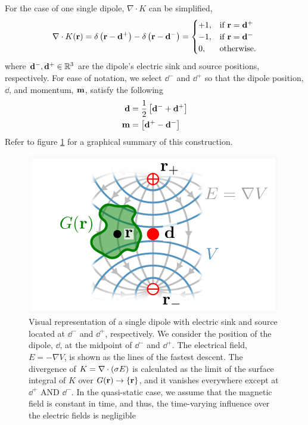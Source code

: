 For the case of one single dipole, $\nabla \cdot K$ can be simplified,
\begin{equation}
\nabla \cdot K(\mathbf{r}) = {\delta\left( \mathbf{r}-\mathbf{d}^+ \right) - \delta\left( \mathbf{r}-\mathbf{d}^- \right)} =
\begin{cases}
+1, &\text{if } \mathbf{r}=\mathbf{d}^+ \\
-1, &\text{if } \mathbf{r}=\mathbf{d}^- \\
0, &\text{otherwise}.
\end{cases}
\label{eq:model2}
\end{equation}
where $\mathbf{d}^-, \mathbf{d}^+ \in \mathbb{R}^3$ are the dipole's electric sink and source positions, respectively. 
%
For ease of notation, we select $\dd^-$ and $\dd^+$ so that the dipole position, $\dd$, and momentum, $\mathbf{m}$, satisfy the following
\begin{align}
    \mathbf{d} &= \frac{1}{2}\left[ \mathbf{d}^-+\mathbf{d}^+ \right] 
    \\
    \mathbf{m} &= \left[ \mathbf{d}^+-\mathbf{d}^- \right]
\end{align}
%
Refer to figure \ref{fig:diagrams1} for a graphical summary of this construction.

\begin{figure}
\centering
\includegraphics{./img_dev/CurrDensFieldOld}
\caption{Visual representation of a single dipole with electric sink and source located at $\dd^-$ and $\dd^+$, respectively.
%
We consider the position of the dipole, $\dd$, at the midpoint of $\dd^-$ and $\dd^+$.
%
The electrical field, $E= -\nabla V$, is shown as the lines of the fastest descent.
%
The divergence of $K = \nabla\cdot\left( \sigma E \right)$ is calculated as the limit of the surface integral of $K$ over $G(\mathbf{r})\rightarrow \left\{ \mathbf{r} \right\}$, and it vanishes everywhere except at $\dd^+$ AND $\dd^-$.
%
In the quasi-static case, we assume that the magnetic field is constant in time, and thus, the time-varying influence over the electric fields is negligible}
\label{fig:diagrams1}
\end{figure}

